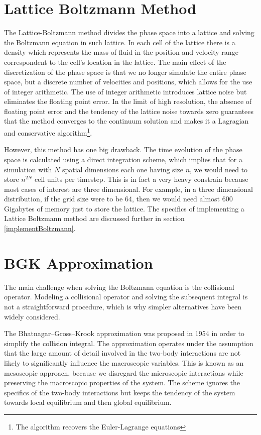 \section{Lattice Boltzmann Method}
\label{boltz}
The Lattice-Boltzmann method divides the phase space into a lattice and solving the Boltzmann equation in such lattice.
In each cell of the lattice there is a density which represents the mass of fluid in the position and velocity range correspondent to the cell's location in the lattice.
The main effect of the discretization of the phase space is that we no longer simulate the entire phase space, but a discrete number of velocities and positions, which allows for the use of integer arithmetic. The use of integer arithmetic introduces lattice noise but eliminates the floating point error. In the limit of high resolution, the absence of floating point error and the tendency of the lattice noise towards zero guarantees that the method converges to the continuum solution and makes it a Lagragian and conservative algorithm\footnote{The algorithm recovers the Euler-Lagrange equations }. %

However, this method has one big drawback. The time evolution of the phase space is calculated using a direct integration scheme, which implies that for a simulation with $N$ spatial dimensions each one having size $n$, we would need to store $n^{2N}$ cell units per timestep. This is in fact a very heavy constrain because most cases of interest are three dimensional. For example, in a three dimensional distribution, if the grid size were to be $64$, then we would need almost 600 Gigabytes of memory just to store the lattice. 
The specifics of implementing a Lattice Boltzmann method are discussed further in section \ref{implementBoltzmann}.



\section{BGK Approximation}
\label{bgk}
The main challenge when solving the Boltzmann equation is the collisional operator. Modeling a collisional operator and solving the subsequent integral is not a straightforward procedure, which is why simpler alternatives have been widely considered.

The Bhatnagar–Gross–Krook approximation was proposed in 1954 \cite{1954PhRv...94..511B} in order to simplify the collision integral.
The approximation operates under the assumption that the large amount of detail involved in the two-body interactions are not likely to significantly influence the macroscopic variables\cite{asinari}.
This is known as an mesoscopic approach, because we disregard the microscopic interactions while preserving the macroscopic properties of the system. 
The scheme ignores the specifics of the two-body interactions but keeps the tendency of the system towards local equilibrium and then global equilibrium.

